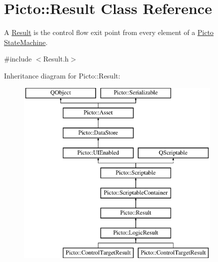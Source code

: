 \hypertarget{class_picto_1_1_result}{\section{Picto\-:\-:Result Class Reference}
\label{class_picto_1_1_result}
}


A \hyperlink{class_picto_1_1_result}{Result} is the control flow exit point from every element of a \hyperlink{namespace_picto}{Picto} \hyperlink{class_picto_1_1_state_machine}{State\-Machine}.  




{\ttfamily \#include $<$Result.\-h$>$}

Inheritance diagram for Picto\-:\-:Result\-:\begin{figure}[H]
\begin{center}
\leavevmode
\includegraphics[height=9.000000cm]{class_picto_1_1_result}
\end{center}
\end{figure}
